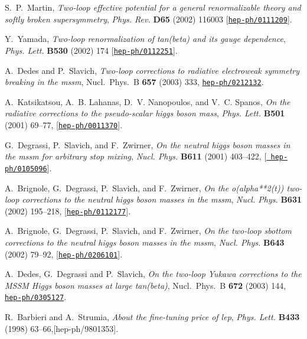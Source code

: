 \documentclass[]{article}
\begin{document}
\begin{thebibliography}{10}
  S.~P.~Martin,
  {\em Two-loop effective potential for a general renormalizable theory and
  softly broken supersymmetry},
  {\em Phys. Rev.}   {\bf D65} (2002) 116003
  [\href{http://xxx.lanl.gov/abs/hep-ph/0111209}{{\tt hep-ph/0111209}}].

  Y.~Yamada,
  {\em Two-loop renormalization of tan(beta) and its gauge dependence},
  {\em Phys. Lett.}   {\bf B530} (2002) 174
  [\href{http://xxx.lanl.gov/abs/hep-ph/0112251}{{\tt hep-ph/0112251}}].

A.~Dedes and P.~Slavich, {\it Two-loop corrections to radiative electroweak
  symmetry breaking in the mssm}, Nucl.\ Phys.\ B {\bf 657} (2003) 333,
  \href{http://xxx.lanl.gov/abs/hep-ph/0212132}{{\tt hep-ph/0212132}}.

A.~Katsikatsou, A.~B. Lahanas, D.~V. Nanopoulos, and V.~C. Spanos, {\it On the
  radiative corrections to the pseudo-scalar higgs boson mass},  {\em Phys.
  Lett.} {\bf B501} (2001) 69--77,
  [\href{http://xxx.lanl.gov/abs/hep-ph/0011370}{{\tt hep-ph/0011370}}].

G.~Degrassi, P.~Slavich, and F.~Zwirner, {\it On the neutral higgs boson masses
  in the mssm for arbitrary stop mixing},  {\em Nucl. Phys.} {\bf B611} (2001)
  403--422, [\href{http://xxx.lanl.gov/abs/hep-ph/0105096}{{\tt
  hep-ph/0105096}}].

A.~Brignole, G.~Degrassi, P.~Slavich, and F.~Zwirner, {\it On the
  o(alpha**2(t)) two-loop corrections to the neutral higgs boson masses in the
  mssm},  {\em Nucl. Phys.} {\bf B631} (2002) 195--218,
  [\href{http://xxx.lanl.gov/abs/hep-ph/0112177}{{\tt hep-ph/0112177}}].

A.~Brignole, G.~Degrassi, P.~Slavich, and F.~Zwirner, {\it On the two-loop
  sbottom corrections to the neutral higgs boson masses in the mssm},  {\em
  Nucl. Phys.} {\bf B643} (2002) 79--92,
  [\href{http://xxx.lanl.gov/abs/hep-ph/0206101}{{\tt hep-ph/0206101}}].

A.~Dedes, G.~Degrassi and P.~Slavich,
{\it On the two-loop Yukawa corrections to the MSSM Higgs boson masses at
  large tan(beta)},   Nucl.\ Phys.\ B {\bf 672} (2003) 144,
  \href{http://xxx.lanl.gov/abs/hep-ph/0305127}{{\tt hep-ph/0305127}}.

R.~Barbieri and A.~Strumia, {\it About the fine-tuning price of lep},  {\em
  Phys. Lett.} {\bf B433} (1998) 63--66,[hep-ph/9801353]. 



\end{thebibliography}
\end{document}
